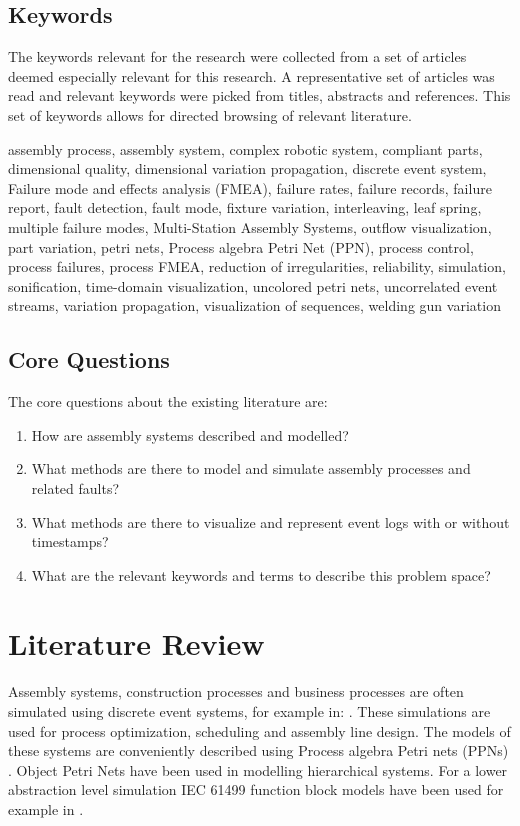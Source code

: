 \documentclass[a4paper,10pt]{article}
\begin{document}
\subsection{Keywords}

The keywords relevant for the research were collected from a set of articles deemed especially relevant for this research. A representative set of articles was
read and relevant keywords were picked from titles, abstracts and references. This set of keywords allows for directed browsing of relevant literature.

assembly process, assembly system, complex robotic system, compliant parts, dimensional quality, dimensional variation propagation, discrete event system,
Failure mode and effects analysis (FMEA), failure rates, failure records, failure report, fault detection, fault mode, fixture variation, interleaving,
leaf spring, multiple failure modes, Multi-Station Assembly Systems, outflow visualization,
part variation, petri nets, Process algebra Petri Net (PPN), process control, process failures, process FMEA, reduction of irregularities, reliability,
simulation, sonification, time-domain visualization, uncolored petri nets, uncorrelated event streams, variation propagation, visualization of sequences,
welding gun variation

\subsection{Core Questions}

The core questions about the existing literature are:
\begin{enumerate}
 \item How are assembly systems described and modelled?
 \item What methods are there to model and simulate assembly processes and related faults?
 \item What methods are there to visualize and represent event logs with or without timestamps?
 \item What are the relevant keywords and terms to describe this problem space?
\end{enumerate}

\section{Literature Review}

Assembly systems, construction processes and business processes are often simulated using discrete event systems, for example in:
\cite{hlupic1998business,zhao2010efficient,kang2013active,rahnama2010fuzzy}. These simulations are used for process optimization\cite{sadeghi2008framework}, scheduling and
assembly line design. The models of these systems are conveniently described using Process algebra Petri nets (PPNs) \cite{falkman2007specification}. Object Petri Nets
have been used in modelling hierarchical systems\cite{wu2015method}. For a lower abstraction level simulation IEC 61499 function block models\cite{tc652004wg6} have been used
for example in \cite{rooker2008modeling}.
\end{document}
